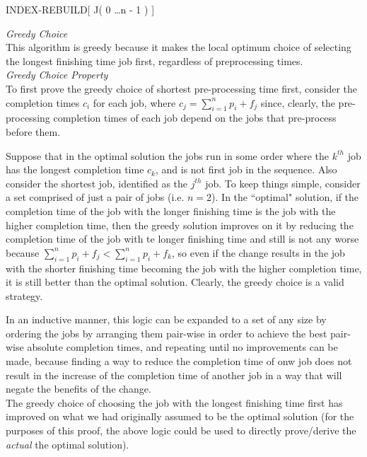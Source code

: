 \documentclass[11pts]{article}
\begin{document}
\begin{enumerate}
\begin{algorithm}{INDEX-REBUILD}[ J( 0 \dots n - 1 ) ]{
   }
\end{algorithm}


  \textit{Greedy Choice} \\
  This algorithm is greedy because it makes the local optimum choice of
  selecting the longest finishing time job first, regardless of
  preprocessing times. \\
  
  \textit{Greedy Choice Property} \\
  To first prove the greedy choice of shortest pre-processing time first,
  consider the completion times $c_i$ for each job, where
  $c_j = \sum_{i=1}^{n}{p_i} + f_j$ since,
  clearly, the pre-processing completion times of each job depend on the
  jobs that pre-process before them.

  Suppose that in the optimal solution the jobs run in some
  order where the $k^{th}$ job has the longest completion time $c_k$, and
  is not first job in the sequence. Also consider the shortest job,
  identified as the $j^{th}$ job. To keep things simple, consider a set
  comprised of just a pair of jobs (i.e. $n=2$). In the ``optimal" solution,
  if the completion time of the job with the longer finishing time is the job
  with the higher completion time, then the greedy solution improves on it by
  reducing the completion time of the job with te longer finishing time and
  still is not any worse because
  $\sum_{i=1}^{n}{p_i} + f_j < \sum_{i=1}^{n}{p_i} + f_k$, so even if the
  change results in the job with the shorter finishing time becoming the
  job with the higher completion time, it is still better than the
  optimal solution. Clearly, the greedy choice is a valid strategy.

  In an inductive manner, this logic can be expanded to a set of
  any size by ordering the jobs
  by arranging
  them pair-wise in order to achieve the best pair-wise absolute
  completion times, and repeating until no improvements can be made,
  because finding a way to reduce the completion time of onw job does
  not result in the increase of the completion time of another job in a
  way that will negate the benefits of the change. \\

  The greedy choice of choosing the job with the longest finishing
  time first has improved on what we had originally assumed to be the
  optimal solution (for the purposes of this proof, the above logic could
  be used to directly prove/derive the \emph{actual} the optimal solution). \\


\end{enumerate}
\end{document}
